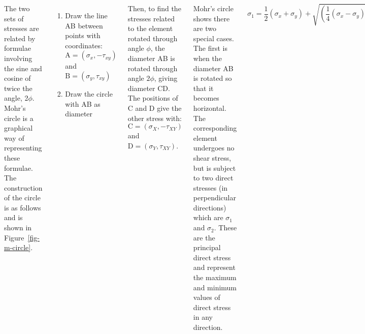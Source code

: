 \documentclass[20pt, a0paper, portrait]{tikzposter}
\begin{document}
\begin{columns}
{\begin{tikzfigure}
        \end{tikzfigure}

        The two sets of stresses are related by formulae involving the sine and cosine of twice the angle, 2\(\phi\). Mohr's circle is a graphical way of representing these formulae. The construction of the circle is as follows and is shown in Figure~\ref{fig-m-circle}.

        \begin{enumerate}
          \item Draw the line AB between points with coordinates: \(\text{A} = (\sigma_x, -\tau_{xy}) \) and \(\text{B} = (\sigma_y, \tau_{xy}) \)
          \item Draw the circle with AB as diameter
        \end{enumerate}

        Then, to find the stresses related to the element rotated through angle \(\phi\), the diameter AB is rotated through angle \(2\phi\), giving diameter CD. The positions of C and D give the other stress with: \(\text{C} = (\sigma_X, -\tau_{XY}) \) and \(\text{D} = (\sigma_Y, \tau_{XY}) \).

        Mohr's circle shows there are two special cases. The first is when the diameter AB is rotated so that it becomes horizontal. The corresponding element undergoes no shear stress, but is subject to two direct stresses (in perpendicular directions) which are \(\sigma_1\) and \(\sigma_2\). These are the principal direct stress and represent the maximum and minimum values of direct stress in any direction.

        \begin{equation}
          \sigma_1 = \frac{1}{2}(\sigma_x+\sigma_y) + \sqrt{\left(\frac{1}{4}(\sigma_x-\sigma_y)^2\right)+\tau_{xy}^2}
        \end{equation}

        \begin{equation}
          \sigma_2 = \frac{1}{2}(\sigma_x+\sigma_y) - \sqrt{\left(\frac{1}{4}(\sigma_x-\sigma_y)^2\right)+\tau_{xy}^2}
        \end{equation}

}
\end{columns}
\end{document}
